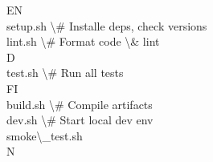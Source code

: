 EN\\
setup.sh                  \textbackslash{}# Installe deps, check versions\\
lint.sh                   \textbackslash{}# Format code \textbackslash{}& lint\\
\vspace{0.5em}
\vspace{0.5em}
\vspace{0.5em}
\vspace{0.5em}
D\\
test.sh                   \textbackslash{}# Run all tests\\
\vspace{0.5em}
\vspace{0.5em}
\vspace{0.5em}
\vspace{0.5em}
FI\\
build.sh                  \textbackslash{}# Compile artifacts\\
dev.sh                    \textbackslash{}# Start local dev env\\
smoke\textbackslash{}_test.sh\\
N\\
